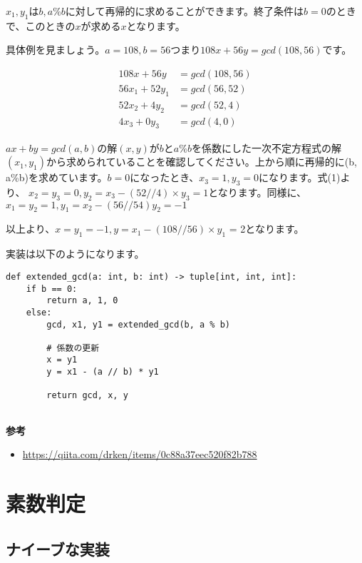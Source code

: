 $x_1, y_1$は$b, a\%b$に対して再帰的に求めることができます。終了条件は$b = 0$のときで、このときの$x$が求める$x$となります。

具体例を見ましょう。$a = 108, b = 56$つまり$108 x + 56 y = gcd(108, 56)$です。

\begin{align*}
    108 x + 56 y &= gcd(108, 56) \\
    56 x_1 + 52 y_1 &= gcd(56, 52) \\
    52 x_2 + 4 y_2 &= gcd(52, 4) \\
    4 x_3 + 0 y_3 &= gcd(4, 0)
\end{align*}

$a x + by = gcd(a, b)$の解$(x, y)$が$b$と$a\%b$を係数にした一次不定方程式の解$(x_1, y_1)$から求められていることを確認してください。上から順に再帰的に(b, a\%b)を求めています。$b = 0$になったとき、$x_3 = 1, y_3 = 0$になります。式(1)より、
$x_2 = y_3 = 0, y_2 = x_3 - (52//4) \times y_3 = 1$となります。同様に、$x_1 = y_2 = 1, y_1 = x_2 - (56 // 54) y_2 = - 1$

以上より、$x = y_1 = -1, y = x_1 - (108 // 56) \times y_1$ = 2となります。

実装は以下のようになります。

\begin{lstlisting}[caption=拡張ユークリッドの互助法実装, frame=TRBL, label={euclid}]
def extended_gcd(a: int, b: int) -> tuple[int, int, int]:
    if b == 0:
        return a, 1, 0
    else:
        gcd, x1, y1 = extended_gcd(b, a % b)
    
        # 係数の更新
        x = y1
        y = x1 - (a // b) * y1
        
        return gcd, x, y
    

\end{lstlisting}

\textbf{参考}
\begin{itemize}
    \item \url{https://qiita.com/drken/items/0c88a37eec520f82b788}
\end{itemize}

\section{素数判定}

\subsection{ナイーブな実装}

